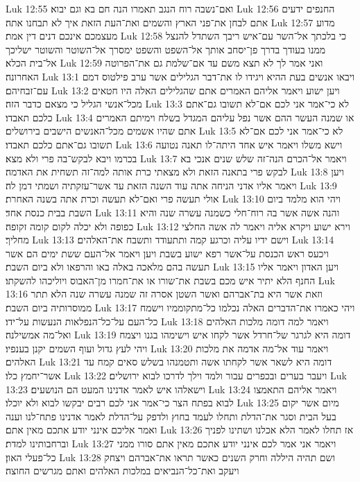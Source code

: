 Luk 12:55  ואם־נשבה רוח הנגב תאמרו הנה חם בא וגם יבוא׃
Luk 12:56  החנפים ידעים אתם לבחן את־פני הארץ והשמים ואת־העת הזאת איך לא תבחנו אתה׃
Luk 12:57  מדוע מעצמכם אינכם דנים דין אמת׃
Luk 12:58  כי בלכתך אל־השר עם־איש ריבך השתדל להנצל ממנו בעודך בדרך פן־יסחב אותך אל־השפט והשפט ימסרך אל־השוטר והשוטר ישליכך אל־בית הכלא׃
Luk 12:59  ואני אמר לך לא תצא משם עד אם־שלמת גם את־הפרוטה האחרונה׃
Luk 13:1  ויבאו אנשים בעת ההיא ויגידו לו את־דבר הגלילים אשר ערב פילטוס דמם עם־זבחיהם׃
Luk 13:2  ויען ישוע ויאמר אליהם האמרים אתם שהגלילים האלה היו חטאים מכל־אנשי הגליל כי מצאם כדבר הזה׃
Luk 13:3  לא כי־אמר אני לכם אם־לא תשובו גם־אתם כלכם תאבדו׃
Luk 13:4  או שמנה העשר ההם אשר נפל עליהם המגדל בשלח וימיתם האמרים אתם שהיו אשמים מכל־האנשים הישבים בירושלים׃
Luk 13:5  לא כי־אמר אני לכם אם־לא תשובו גם־אתם כלכם תאבדו׃
Luk 13:6  וישא משלו ויאמר איש אחד היתה־לו תאנה נטועה בכרמו ויבא לבקש־בה פרי ולא מצא׃
Luk 13:7  ויאמר אל־הכרם הנה־זה שלש שנים אנכי בא לבקש פרי בתאנה הזאת ולא מצאתי כרת אותה למה־זה תשחית את האדמה׃
Luk 13:8  ויען ויאמר אליו אדני הניחה אתה עוד השנה הזאת עד אשר־עזקתיה ושמתי דמן לה׃
Luk 13:9  אולי תעשה פרי ואם־לא תעשה וכרת אתה בשנה האחרת׃
Luk 13:10  ויהי הוא מלמד ביום השבת בבית כנסת אחד׃
Luk 13:11  והנה אשה אשר בה רוח־חלי כשמנה עשרה שנה והיא כפופה ולא יכלה לקום קומה זקופה׃
Luk 13:12  וירא ישוע ויקרא אליה ויאמר לה אשה החלצי מחליך׃
Luk 13:13  וישם ידיו עליה וכרגע קמה ותתעודד ותשבח את־האלהים׃
Luk 13:14  ויכעס ראש הכנסת על־אשר רפא ישוע בשבת ויען ויאמר אל־העם ששת ימים הם אשר תעשה בהם מלאכה באלה באו והרפאו ולא ביום השבת׃
Luk 13:15  ויען האדון ויאמר אליו החנף הלא יתיר איש מכם בשבת את־שורו או את־חמרו מן־האבוס ויוליכהו להשקתו׃
Luk 13:16  וזאת אשר היא בת־אברהם ואשר השטן אסרה זה שמנה עשרה שנה הלא תתר ממוסרותיה ביום השבת׃
Luk 13:17  ויהי כאמרו את־הדברים האלה נכלמו כל־מתקוממיו וישמח כל־העם על־כל־הנפלאות הנעשות על־ידו׃
Luk 13:18  ויאמר למה דומה מלכות האלהים ואל־מה אמשילנה׃
Luk 13:19  דומה היא לגרגר של־חרדל אשר לקחו איש וישימהו בגנו ויצמח ויהי לעץ גדול ועוף השמים יקנן בענפיו׃
Luk 13:20  ויאמר עוד אל־מה אדמה את מלכות האלהים׃
Luk 13:21  דומה היא לשאר אשר לקחתו אשה ותטמנהו בשלש סאים קמח עד אשר־יחמץ כלו׃
Luk 13:22  ויעבר בערים ובכפרים עבור ולמד וילך לדרכו לבוא ירושלים׃
Luk 13:23  וישאלהו איש לאמר אדנינו המעט הם הנושעים׃
Luk 13:24  ויאמר אליהם התאמצו לבוא בפתח הצר כי־אמר אני לכם רבים יבקשו לבוא ולא יוכלו׃
Luk 13:25  מיום אשר יקום בעל הבית וסגר את־הדלת ותחלו לעמד בחוץ ולדפק על־הדלת לאמר אדנינו פתח־לנו וענה ואמר אליכם אינני יודע אתכם מאין אתם׃
Luk 13:26  אז תחלו לאמר הלא אכלנו ושתינו לפניך וברחבותינו למדת׃
Luk 13:27  ויאמר אני אמר לכם אינני יודע אתכם מאין אתם סורו ממני כל־פעלי האון׃
Luk 13:28  ושם תהיה היללה וחרק השנים כאשר תראו את־אברהם ויצחק ויעקב ואת־כל־הנביאים במלכות האלהים ואתם מגרשים החוצה׃
